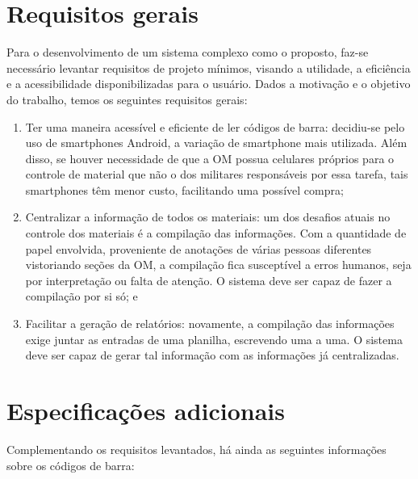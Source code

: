 \section{Requisitos gerais}

Para o desenvolvimento de um sistema complexo como o proposto, faz-se necessário levantar requisitos de projeto mínimos, visando a utilidade, a eficiência e a acessibilidade disponibilizadas para o usuário. Dados a motivação e o objetivo do trabalho, temos os seguintes requisitos gerais:

\begin{enumerate}

	\item Ter uma maneira acessível e eficiente de ler códigos de barra: decidiu-se pelo uso de smartphones Android, a variação de smartphone mais utilizada. Além disso, se houver necessidade de que a OM possua celulares próprios para o controle de material que não o dos militares responsáveis por essa tarefa, tais smartphones têm menor custo, facilitando uma possível compra;

	\item Centralizar a informação de todos os materiais: um dos desafios atuais no controle dos materiais é a compilação das informações. Com a quantidade de papel envolvida, proveniente de anotações de várias pessoas diferentes vistoriando seções da OM, a compilação fica susceptível a erros humanos, seja por interpretação ou falta de atenção. O sistema deve ser capaz de fazer a compilação por si só; e
    
    \item Facilitar a geração de relatórios: novamente, a compilação das informações exige juntar as entradas de uma planilha, escrevendo uma a uma. O sistema deve ser capaz de gerar tal informação com as informações já centralizadas.
    
\end{enumerate}

\section{Especificações adicionais}

Complementando os requisitos levantados, há ainda as seguintes informações sobre os códigos de barra:

